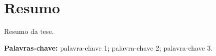 \chapter*{Resumo}

Resumo da tese.

\vspace{1cm}

\textbf{Palavras-chave:} palavra-chave 1; palavra-chave 2; palavra-chave 3.

\cleardoublepage
